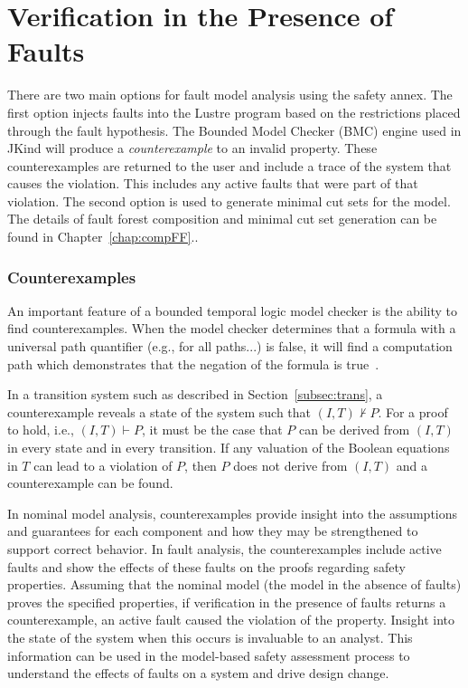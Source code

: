 \section{Verification in the Presence of Faults}
\label{sec:analysisResults}
There are two main options for fault model analysis using the safety annex. The first option injects faults into the Lustre program based on the restrictions placed through the fault hypothesis. The Bounded Model Checker (BMC) engine used in JKind will produce a {\em counterexample} to an invalid property. These counterexamples are returned to the user and include a trace of the system that causes the violation. This includes any active faults that were part of that violation. The second option is used to generate minimal cut sets for the model. The details of fault forest composition and minimal cut set generation can be found in Chapter~\ref{chap:compFF}.. 

\subsubsection{Counterexamples}
An important feature of a bounded temporal logic model checker is the ability to find counterexamples. When the model checker determines that a formula with a universal path quantifier (e.g., for all paths...) is false, it will find a computation path which demonstrates that the negation of the formula is true~\cite{clarke2018model}. 

In a transition system such as described in Section~\ref{subsec:trans}, a counterexample reveals a state of the system such that $(I, T) \not \vdash P$. For a proof to hold, i.e., $(I, T) \vdash P$, it must be the case that $P$ can be derived from $(I,T)$ in every state and in every transition. If any valuation of the Boolean equations in $T$ can lead to a violation of $P$, then $P$ does not derive from $(I,T)$ and a counterexample can be found. 

In nominal model analysis, counterexamples provide insight into the assumptions and guarantees for each component and how they may be strengthened to support correct behavior. In fault analysis, the counterexamples include active faults and show the effects of these faults on the proofs regarding safety properties. Assuming that the nominal model (the model in the absence of faults) proves the specified properties, if verification in the presence of faults returns a counterexample, an active fault caused the violation of the property. Insight into the state of the system when this occurs is invaluable to an analyst. This information can be used in the model-based safety assessment process to understand the effects of faults on a system and drive design change. 

